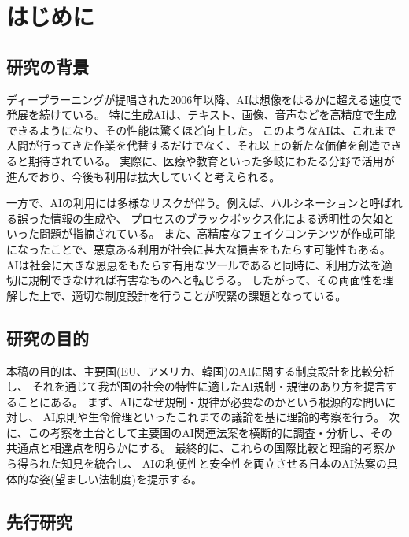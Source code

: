 \chapter{はじめに}

\section{研究の背景}
ディープラーニングが提唱された2006年以降、AIは想像をはるかに超える速度で発展を続けている。
特に生成AIは、テキスト、画像、音声などを高精度で生成できるようになり、その性能は驚くほど向上した。
このようなAIは、これまで人間が行ってきた作業を代替するだけでなく、それ以上の新たな価値を創造できると期待されている。
実際に、医療や教育といった多岐にわたる分野で活用が進んでおり、今後も利用は拡大していくと考えられる。

一方で、AIの利用には多様なリスクが伴う。例えば、ハルシネーションと呼ばれる誤った情報の生成や、
プロセスのブラックボックス化による透明性の欠如といった問題が指摘されている。
また、高精度なフェイクコンテンツが作成可能になったことで、悪意ある利用が社会に甚大な損害をもたらす可能性もある。
AIは社会に大きな恩恵をもたらす有用なツールであると同時に、利用方法を適切に規制できなければ有害なものへと転じうる。
したがって、その両面性を理解した上で、適切な制度設計を行うことが喫緊の課題となっている。


\section{研究の目的}
本稿の目的は、主要国(EU、アメリカ、韓国)のAIに関する制度設計を比較分析し、
それを通じて我が国の社会の特性に適したAI規制・規律のあり方を提言することにある。
まず、AIになぜ規制・規律が必要なのかという根源的な問いに対し、
AI原則や生命倫理といったこれまでの議論を基に理論的考察を行う。
次に、この考察を土台として主要国のAI関連法案を横断的に調査・分析し、その共通点と相違点を明らかにする。
最終的に、これらの国際比較と理論的考察から得られた知見を統合し、
AIの利便性と安全性を両立させる日本のAI法案の具体的な姿(望ましい法制度)を提示する。

\section{先行研究}


